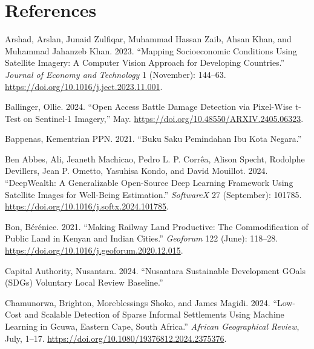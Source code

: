 \documentclass[
  letterpaper,
  DIV=11,
  numbers=noendperiod]{scrreprt}
\newlength{\cslhangindent}
\newlength{\cslentryspacingunit} %
\newenvironment{CSLReferences}[2] %
 {%
  \setlength{\parindent}{0pt}
  \ifodd #1
  \let\oldpar\par
  \def\par{\hangindent=\cslhangindent\oldpar}
  \fi
  \setlength{\parskip}{#2\cslentryspacingunit}
 }%
 {}
\begin{document}
\hypertarget{references-6}{%
\section*{References}\label{references-6}}

\hypertarget{refs}{}
\begin{CSLReferences}{1}{0}
\leavevmode{}%
Arshad, Arslan, Junaid Zulfiqar, Muhammad Hassan Zaib, Ahsan Khan, and
Muhammad Jahanzeb Khan. 2023. {``Mapping Socioeconomic Conditions Using
Satellite Imagery: A Computer Vision Approach for Developing
Countries.''} \emph{Journal of Economy and Technology} 1 (November):
144--63. \url{https://doi.org/10.1016/j.ject.2023.11.001}.

\leavevmode{}%
Ballinger, Ollie. 2024. {``Open Access Battle Damage Detection via
Pixel-Wise t-Test on Sentinel-1 Imagery,''} May.
\url{https://doi.org/10.48550/ARXIV.2405.06323}.

\leavevmode{}%
Bappenas, Kementrian PPN. 2021. {``Buku Saku Pemindahan Ibu Kota
Negara.''}

\leavevmode{}%
Ben Abbes, Ali, Jeaneth Machicao, Pedro L. P. Corrêa, Alison Specht,
Rodolphe Devillers, Jean P. Ometto, Yasuhisa Kondo, and David Mouillot.
2024. {``DeepWealth: A Generalizable Open-Source Deep Learning Framework
Using Satellite Images for Well-Being Estimation.''} \emph{SoftwareX} 27
(September): 101785. \url{https://doi.org/10.1016/j.softx.2024.101785}.

\leavevmode{}%
Bon, Bérénice. 2021. {``Making Railway Land Productive: The
Commodification of Public Land in Kenyan and Indian Cities.''}
\emph{Geoforum} 122 (June): 118--28.
\url{https://doi.org/10.1016/j.geoforum.2020.12.015}.

\leavevmode{}%
Capital Authority, Nusantara. 2024. {``Nusantara Sustainable Development
GOals (SDGs) Voluntary Local Review Baseline.''}

\leavevmode{}%
Chamunorwa, Brighton, Moreblessings Shoko, and James Magidi. 2024.
{``Low-Cost and Scalable Detection of Sparse Informal Settlements Using
Machine Learning in Gcuwa, Eastern Cape, South Africa.''} \emph{African
Geographical Review}, July, 1--17.
\url{https://doi.org/10.1080/19376812.2024.2375376}.


\end{CSLReferences}
\end{document}
